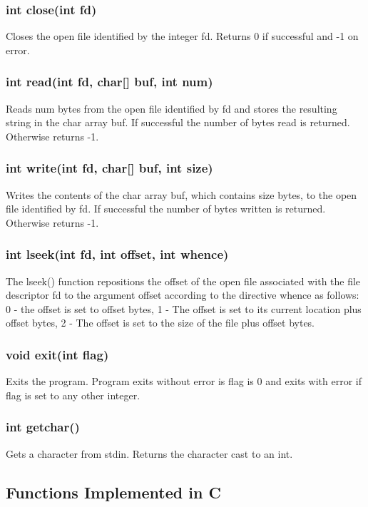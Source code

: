 \begin{homeworkProblem}
	\subsubsection{int close(int fd)}
	Closes the open file identified by the integer fd. Returns 0 if successful and -1 on error.
	\subsubsection{int read(int fd, char[] buf, int num)}
	Reads num bytes from the open file identified by fd and stores the resulting string in the char array buf. If successful the number of bytes read is returned. Otherwise returns -1.
	\subsubsection{int write(int fd, char[] buf, int size)}
	Writes the contents of the char array buf, which contains size bytes, to the open file identified by fd. If successful the number of bytes written is returned. Otherwise returns -1.
	\subsubsection{int lseek(int fd, int offset, int whence)}
	The lseek() function repositions the offset of the open file associated with the file descriptor fd to the argument offset according to the directive whence as follows: 0 - the offset is set to offset bytes, 1 - The offset is set to its current location plus offset bytes, 2 - The offset is set to the size of the file plus offset bytes.
	\subsubsection{void exit(int flag)}
	Exits the program. Program exits without error is flag is 0 and exits with error if flag is set to any other integer.
	\subsubsection{int getchar()}
	Gets a character from stdin. Returns the character cast to an int.
	\subsection{Functions Implemented in C}
\end{homeworkProblem}
